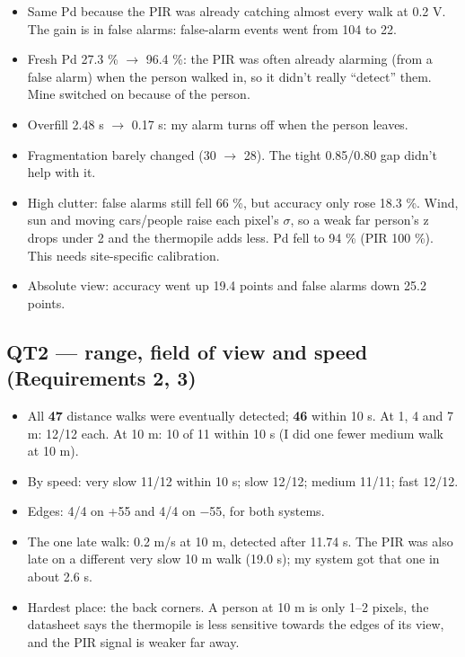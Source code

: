 \documentclass[11pt,a4paper]{article}
\providecommand{\tightlist}{\setlength{\itemsep}{0pt}\setlength{\parskip}{0pt}}
\begin{document}
\begin{itemize}
\tightlist
\item
  Same Pd because the PIR was
  already catching almost
  every walk at 0.2 V. The
  gain is in false alarms:
  false-alarm events went from
  104 to 22.
\item
  Fresh Pd 27.3 \% $\rightarrow$ 96.4 \%:
  the PIR was often already
  alarming (from a false
  alarm) when the person
  walked in, so it didn't
  really ``detect'' them. Mine
  switched on because of the
  person.
\item
  Overfill 2.48 s $\rightarrow$ 0.17 s: my
  alarm turns off when the
  person leaves.
\item
  Fragmentation barely changed
  (30 $\rightarrow$ 28). The tight
  0.85/0.80 gap didn't help
  with it.
\item
  High clutter: false alarms
  still fell 66 \%, but
  accuracy only rose 18.3 \%.
  Wind, sun and moving
  cars/people raise each
  pixel's $\sigma$, so a weak far
  person's z drops under 2 and
  the thermopile adds less. Pd
  fell to 94 \% (PIR 100 \%).
  This needs site-specific
  calibration.
\item
  Absolute view: accuracy went
  up 19.4 points and false
  alarms down 25.2 points.
\end{itemize}

\hypertarget{qt2-range-field-of-view-and-speed-requirements-2-3}{%
\subsection{QT2 --- range,
field of view and speed
(Requirements 2,
3)}\label{qt2-range-field-of-view-and-speed-requirements-2-3}}

\begin{itemize}
\tightlist
\item
  All \textbf{47} distance
  walks were eventually
  detected; \textbf{46} within
  10 s. At 1, 4 and 7 m: 12/12
  each. At 10 m: 10 of 11
  within 10 s (I did one fewer
  medium walk at 10 m).
\item
  By speed: very slow 11/12
  within 10 s; slow 12/12;
  medium 11/11; fast 12/12.
\item
  Edges: 4/4 on +55\textdegree{} and 4/4
  on $-$55\textdegree{}, for both systems.
\item
  The one late walk: 0.2 m/s
  at 10 m, detected after
  11.74 s. The PIR was also
  late on a different very
  slow 10 m walk (19.0 s); my
  system got that one in about
  2.6 s.
\item
  Hardest place: the back
  corners. A person at 10 m is
  only 1--2 pixels, the
  datasheet says the
  thermopile is less sensitive
  towards the edges of its
  view, and the PIR signal is
  weaker far away.
\end{itemize}
\end{document}
